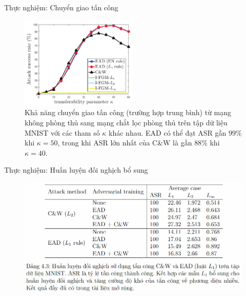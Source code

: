 \begin{frame}{Thực nghiệm: Chuyển giao tấn công}
    \begin{figure}[H] %
        \centering %
        \includegraphics[width=0.5\textwidth]{images/fig_04.png} 
        \caption{Khả năng chuyển giao tấn công (trường hợp trung bình) từ mạng không phòng thủ sang mạng chắt lọc phòng thủ  trên tập dữ liệu MNIST với các tham số $\kappa$ khác nhau. EAD có thể đạt ASR gần $99\%$ khi $\kappa = 50$, trong khi ASR lớn nhất của C\&W là gần $88\%$ khi $\kappa=40$.} %
        \label{fig:fg_04}
    \end{figure}
\end{frame}

\begin{frame}{Thực nghiệm: Huấn luyện đối nghịch bổ sung}
    \begin{figure}
        \centering
        \includegraphics[scale=0.55]{images/tab_4_3.png}
    \end{figure}
\end{frame}

